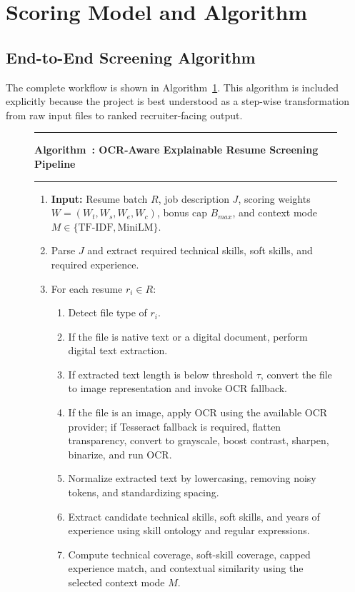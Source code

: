 \section{Scoring Model and Algorithm}
\subsection{End-to-End Screening Algorithm}
The complete workflow is shown in Algorithm~\ref{alg:endtoend}. This algorithm is included explicitly because the project is best understood as a step-wise transformation from raw input files to ranked recruiter-facing output.

\begin{figure}[!ht]
\hrule
\vspace{3pt}
\label{alg:endtoend}
\textbf{Algorithm~\thealgorithm: OCR-Aware Explainable Resume Screening Pipeline}
\vspace{3pt}
\hrule
\vspace{4pt}
\begin{enumerate}
    \item \textbf{Input:} Resume batch \(R\), job description \(J\), scoring weights \(W=(W_t,W_s,W_e,W_c)\), bonus cap \(B_{max}\), and context mode \(M \in \{\text{TF-IDF},\text{MiniLM}\}\).
    \item Parse \(J\) and extract required technical skills, soft skills, and required experience.
    \item For each resume \(r_i \in R\):
    \begin{enumerate}
        \item Detect file type of \(r_i\).
        \item If the file is native text or a digital document, perform digital text extraction.
        \item If extracted text length is below threshold \(\tau\), convert the file to image representation and invoke OCR fallback.
        \item If the file is an image, apply OCR using the available OCR provider; if Tesseract fallback is required, flatten transparency, convert to grayscale, boost contrast, sharpen, binarize, and run OCR.
        \item Normalize extracted text by lowercasing, removing noisy tokens, and standardizing spacing.
        \item Extract candidate technical skills, soft skills, and years of experience using skill ontology and regular expressions.
        \item Compute technical coverage, soft-skill coverage, capped experience match, and contextual similarity using the selected context mode \(M\).

\end{enumerate}
\end{enumerate}
\end{figure}
